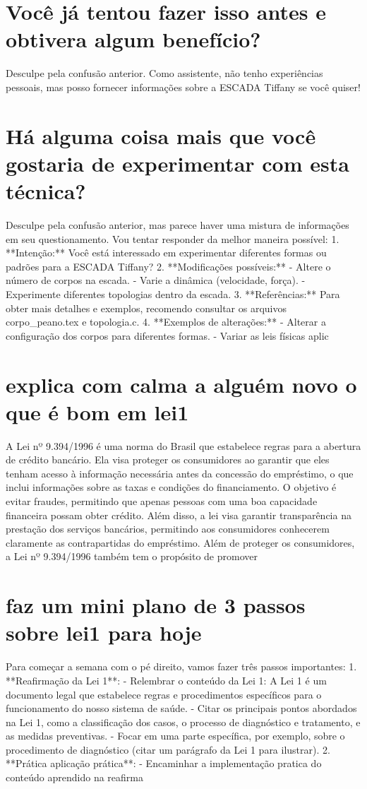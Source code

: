 \documentclass[11pt,a4paper]{article}
\begin{document}
\section{Você já tentou fazer isso antes e obtivera algum benefício?}
Desculpe pela confusão anterior. Como assistente, não tenho experiências pessoais, mas posso fornecer informações sobre a ESCADA Tiffany se você quiser!

\section{Há alguma coisa mais que você gostaria de experimentar com esta técnica?}
Desculpe pela confusão anterior, mas parece haver uma mistura de informações em seu questionamento. Vou tentar responder da melhor maneira possível: 1. **Intenção:** Você está interessado em experimentar diferentes formas ou padrões para a ESCADA Tiffany? 2. **Modificações possíveis:** - Altere o número de corpos na escada. - Varie a dinâmica (velocidade, força). - Experimente diferentes topologias dentro da escada. 3. **Referências:** Para obter mais detalhes e exemplos, recomendo consultar os arquivos corpo\_peano.tex e topologia.c. 4. **Exemplos de alterações:** - Alterar a configuração dos corpos para diferentes formas. - Variar as leis físicas aplic

\section{explica com calma a alguém novo o que é bom em lei1}
A Lei nº 9.394/1996 é uma norma do Brasil que estabelece regras para a abertura de crédito bancário. Ela visa proteger os consumidores ao garantir que eles tenham acesso à informação necessária antes da concessão do empréstimo, o que inclui informações sobre as taxas e condições do financiamento. O objetivo é evitar fraudes, permitindo que apenas pessoas com uma boa capacidade financeira possam obter crédito. Além disso, a lei visa garantir transparência na prestação dos serviços bancários, permitindo aos consumidores conhecerem claramente as contrapartidas do empréstimo. Além de proteger os consumidores, a Lei nº 9.394/1996 também tem o propósito de promover

\section{faz um mini plano de 3 passos sobre lei1 para hoje}
Para começar a semana com o pé direito, vamos fazer três passos importantes: 1. **Reafirmação da Lei 1**: - Relembrar o conteúdo da Lei 1: A Lei 1 é um documento legal que estabelece regras e procedimentos específicos para o funcionamento do nosso sistema de saúde. - Citar os principais pontos abordados na Lei 1, como a classificação dos casos, o processo de diagnóstico e tratamento, e as medidas preventivas. - Focar em uma parte específica, por exemplo, sobre o procedimento de diagnóstico (citar um parágrafo da Lei 1 para ilustrar). 2. **Prática aplicação prática**: - Encaminhar a implementação pratica do conteúdo aprendido na reafirma
\end{document}
